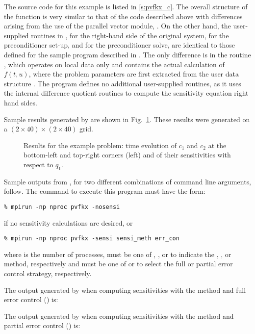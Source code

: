 The source code for this example is listed in \A\ref{s:pvfkx_c}.
The overall structure of the  function is very
similar to that of the code  described above with 
differences arising from the use of the parallel vector module, {\nvecp}.
On the other hand, the user-supplied routines in ,
 for the right-hand side of the original system,
 for the preconditioner set-up, and  for the
preconditioner solve, are identical to those defined for the sample program
 described in \cite{cvode2.2.0_ex}. The only difference is in the
routine , which operates on local data only and contains the actual 
calculation of $f(t,u)$, where the problem parameters are first extracted from
the user data structure . The program  defines no additional
user-supplied routines, as it uses the {\cvodes} internal difference quotient routines 
to compute the sensitivity equation right hand sides.

Sample results generated by  are shown in Fig.~\ref{f:pvfkx}. 
These results were generated on a $(2\times40)\times(2\times40)$ grid.
\begin{figure}
  {\centerline{}}
  \caption[Results for the  example problem.]
  {Results for the  example problem:
    time evolution of $c_1$ and $c_2$ at the bottom-left and top-right corners
    (left) and of their sensitivities with respect to $q_1$.}
  \label{f:pvfkx}
\end{figure}

Sample outputs from , for two different combinations of command line arguments, 
follow. The command to execute this program must have the form:
\begin{verbatim}
% mpirun -np nproc pvfkx -nosensi
\end{verbatim} 
if no sensitivity calculations are desired, or
\begin{verbatim}
% mpirun -np nproc pvfkx -sensi sensi_meth err_con
\end{verbatim}
where  is the number of processes,  must be one of , 
, or  to
indicate the , , or  method,
respectively and  must be one of  or  to
select the full or partial error control strategy, respectively.

The output generated by  when computing sensitivities with the 
method and full error control () is:

\vspace{0.1in}

The output generated by  when computing sensitivities with the 
method and partial error control () is:

\vspace{0,1in}

